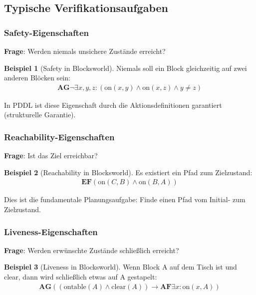 ﻿\documentclass[a4paper,12pt]{article}
\theoremstyle{definition}
\newtheorem{beispiel}{Beispiel}[section]
\begin{document}
\subsection{Typische Verifikationsaufgaben}

\subsubsection{Safety-Eigenschaften}

\textbf{Frage}: Werden niemals unsichere Zustände erreicht?

\begin{beispiel}[Safety in Blocksworld]
	Niemals soll ein Block gleichzeitig auf zwei anderen Blöcken sein:
	\begin{align}
	\mathbf{AG}\neg\exists x, y, z: (\text{on}(x,y) \land \text{on}(x,z) \land y \neq z)
	\end{align}
\end{beispiel}

In PDDL ist diese Eigenschaft durch die Aktionsdefinitionen garantiert (strukturelle Garantie).

\subsubsection{Reachability-Eigenschaften}

\textbf{Frage}: Ist das Ziel erreichbar?

\begin{beispiel}[Reachability in Blocksworld]
	Es existiert ein Pfad zum Zielzustand:
	\begin{align}
	\mathbf{EF}(\text{on}(C, B) \land \text{on}(B, A))
	\end{align}
\end{beispiel}

Dies ist die fundamentale Planungsaufgabe: Finde einen Pfad vom Initial- zum Zielzustand.

\subsubsection{Liveness-Eigenschaften}

\textbf{Frage}: Werden erwünschte Zustände schließlich erreicht?

\begin{beispiel}[Liveness in Blocksworld]
	Wenn Block A auf dem Tisch ist und clear, dann wird schließlich etwas auf A gestapelt:
	\begin{align}
	\mathbf{AG}((\text{ontable}(A) \land \text{clear}(A)) \to \mathbf{AF}\exists x: \text{on}(x, A))
	\end{align}
\end{beispiel}
\end{document}
